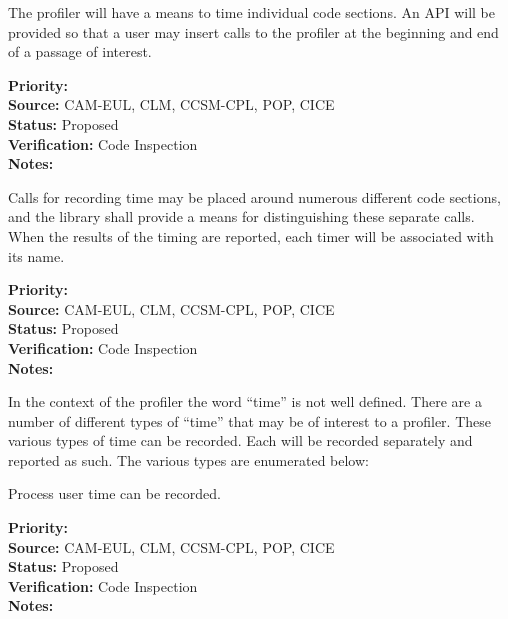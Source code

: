 

The profiler will have a means to time individual code sections.  An API will be 
provided so that a user may insert calls to the profiler at the beginning and
end of a passage of interest.

\begin{reqlist}
{\bf Priority:} \\
{\bf Source:} CAM-EUL, CLM, CCSM-CPL, POP, CICE \\
{\bf Status:} Proposed \\
{\bf Verification:} Code Inspection \\
{\bf Notes:} 
\end{reqlist}


Calls for recording time may be placed around numerous different code sections, 
and the library shall provide a means for distinguishing these separate calls.  When
the results of the timing are reported, each timer will be associated with its name.

\begin{reqlist}
{\bf Priority:} \\
{\bf Source:} CAM-EUL, CLM, CCSM-CPL, POP, CICE \\
{\bf Status:} Proposed \\
{\bf Verification:} Code Inspection \\
{\bf Notes:} 
\end{reqlist}


In the context of the profiler the word ``time'' is not well defined.  There are
a number of different types of ``time'' that may be of interest to a profiler.
These various types of time can be recorded.  Each will be recorded separately and reported
as such.  The various types are enumerated below:


Process user time can be recorded.

\begin{reqlist}
{\bf Priority:}  \\
{\bf Source:} CAM-EUL, CLM, CCSM-CPL, POP, CICE \\
{\bf Status:} Proposed \\
{\bf Verification:} Code Inspection \\
{\bf Notes:} 
\end{reqlist}

